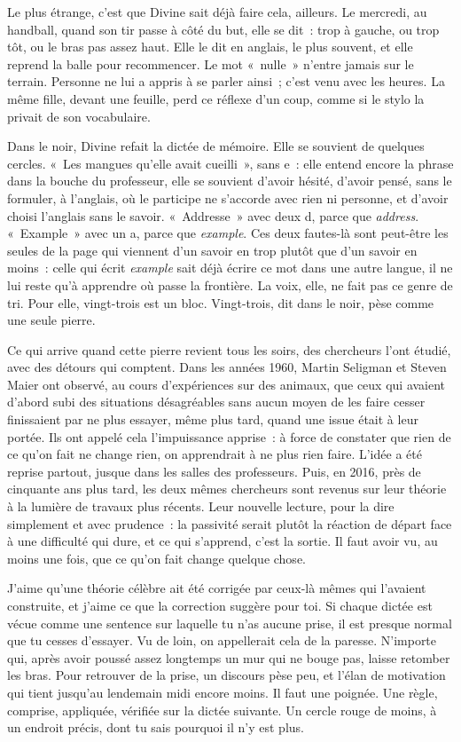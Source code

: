 \documentclass[10.5pt,twoside,openright]{book}
\begin{document}
Le plus étrange, c’est que Divine sait déjà faire cela, ailleurs. Le mercredi, au handball, quand son tir passe à côté du but, elle se dit : trop à gauche, ou trop tôt, ou le bras pas assez haut. Elle le dit en anglais, le plus souvent, et elle reprend la balle pour recommencer. Le mot « nulle » n’entre jamais sur le terrain. Personne ne lui a appris à se parler ainsi ; c’est venu avec les heures. La même fille, devant une feuille, perd ce réflexe d’un coup, comme si le stylo la privait de son vocabulaire.

Dans le noir, Divine refait la dictée de mémoire. Elle se souvient de quelques cercles. « Les mangues qu’elle avait cueilli », sans e : elle entend encore la phrase dans la bouche du professeur, elle se souvient d’avoir hésité, d’avoir pensé, sans le formuler, à l’anglais, où le participe ne s’accorde avec rien ni personne, et d’avoir choisi l’anglais sans le savoir. « Addresse » avec deux d, parce que \emph{address}. « Example » avec un a, parce que \emph{example}. Ces deux fautes-là sont peut-être les seules de la page qui viennent d’un savoir en trop plutôt que d’un savoir en moins : celle qui écrit \emph{example} sait déjà écrire ce mot dans une autre langue, il ne lui reste qu’à apprendre où passe la frontière. La voix, elle, ne fait pas ce genre de tri. Pour elle, vingt-trois est un bloc. Vingt-trois, dit dans le noir, pèse comme une seule pierre.

Ce qui arrive quand cette pierre revient tous les soirs, des chercheurs l’ont étudié, avec des détours qui comptent. Dans les années 1960, Martin Seligman et Steven Maier ont observé, au cours d’expériences sur des animaux, que ceux qui avaient d’abord subi des situations désagréables sans aucun moyen de les faire cesser finissaient par ne plus essayer, même plus tard, quand une issue était à leur portée. Ils ont appelé cela l’impuissance apprise : à force de constater que rien de ce qu’on fait ne change rien, on apprendrait à ne plus rien faire. L’idée a été reprise partout, jusque dans les salles des professeurs. Puis, en 2016, près de cinquante ans plus tard, les deux mêmes chercheurs sont revenus sur leur théorie à la lumière de travaux plus récents. Leur nouvelle lecture, pour la dire simplement et avec prudence : la passivité serait plutôt la réaction de départ face à une difficulté qui dure, et ce qui s’apprend, c’est la sortie. Il faut avoir vu, au moins une fois, que ce qu’on fait change quelque chose.

J’aime qu’une théorie célèbre ait été corrigée par ceux-là mêmes qui l’avaient construite, et j’aime ce que la correction suggère pour toi. Si chaque dictée est vécue comme une sentence sur laquelle tu n’as aucune prise, il est presque normal que tu cesses d’essayer. Vu de loin, on appellerait cela de la paresse. N’importe qui, après avoir poussé assez longtemps un mur qui ne bouge pas, laisse retomber les bras. Pour retrouver de la prise, un discours pèse peu, et l’élan de motivation qui tient jusqu’au lendemain midi encore moins. Il faut une poignée. Une règle, comprise, appliquée, vérifiée sur la dictée suivante. Un cercle rouge de moins, à un endroit précis, dont tu sais pourquoi il n’y est plus.
\end{document}
